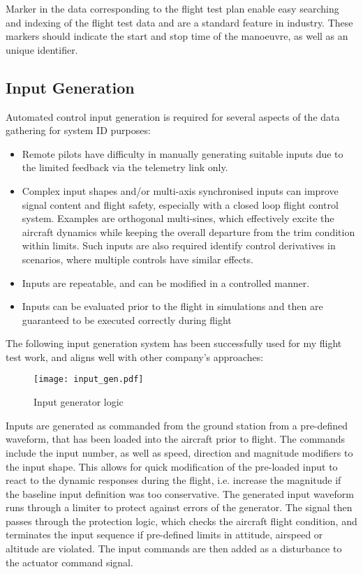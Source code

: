 \documentclass[11pt,a4paper]{article}
\begin{document}
Marker in the data corresponding to the flight test plan enable easy searching and indexing of the flight test data and are a standard feature in industry. These markers should indicate the start and stop time of the manoeuvre, as well as an unique identifier.

\subsection{Input Generation}

Automated control input generation is required for several aspects of the data gathering for system ID purposes:

\begin{itemize}
\item Remote pilots have difficulty in manually generating suitable inputs due to the limited feedback via the telemetry link only.
\item Complex input shapes and/or multi-axis synchronised inputs can improve signal content and flight safety, especially with a closed loop flight control system. Examples are orthogonal multi-sines, which effectively excite the aircraft dynamics while keeping the overall departure from the trim condition within limits. Such inputs are also required identify control derivatives in scenarios, where multiple controls have similar effects.
\item Inputs are repeatable, and can be modified in a controlled manner.
\item Inputs can be evaluated prior to the flight in simulations and then are guaranteed to be executed correctly during flight
\end{itemize}

The following input generation system has been successfully used for my flight test work, and aligns well with other company's approaches:

\begin{figure}[!ht]
\center
\texttt{[image: input\_gen.pdf]}
\caption{Input generator logic}
\label{input_gen}
\end{figure}

\newpage
Inputs are generated as commanded from the ground station from a pre-defined waveform, that has been loaded into the aircraft prior to flight. The commands include the input number, as well as speed, direction and magnitude modifiers to the input shape. This allows for quick modification of the pre-loaded input to react to the dynamic responses during the flight, i.e. increase the magnitude if the baseline input definition was too conservative. The generated input waveform runs through a limiter to protect against errors of the generator. The signal then passes through the protection logic, which checks the aircraft flight condition, and terminates the input sequence if pre-defined limits in attitude, airspeed or altitude are violated. The input commands are then added as a disturbance to the actuator command signal.
\end{document}

